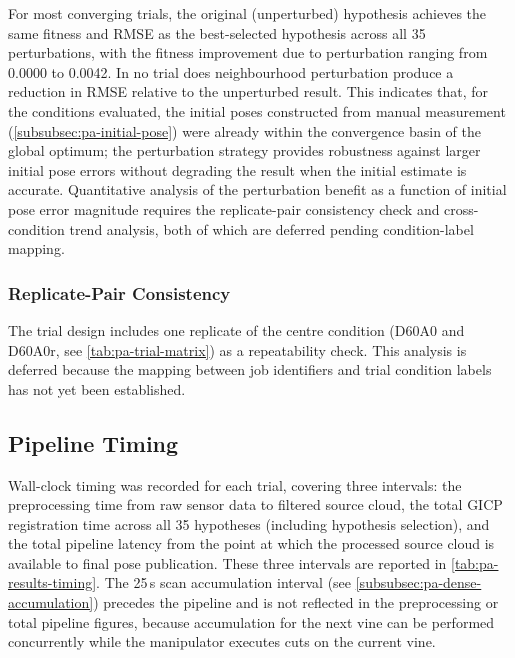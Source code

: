 For most converging trials, the original (unperturbed) hypothesis achieves the same fitness and RMSE as the best-selected hypothesis across all 35 perturbations, with the fitness improvement due to perturbation ranging from 0.0000 to 0.0042. In no trial does neighbourhood perturbation produce a reduction in RMSE relative to the unperturbed result. This indicates that, for the conditions evaluated, the initial poses constructed from manual measurement (\cref{subsubsec:pa-initial-pose}) were already within the convergence basin of the global optimum; the perturbation strategy provides robustness against larger initial pose errors without degrading the result when the initial estimate is accurate. Quantitative analysis of the perturbation benefit as a function of initial pose error magnitude requires the replicate-pair consistency check and cross-condition trend analysis, both of which are deferred pending condition-label mapping.

\subsubsection*{Replicate-Pair Consistency}

The trial design includes one replicate of the centre condition (D60A0 and D60A0r, see \cref{tab:pa-trial-matrix}) as a repeatability check. This analysis is deferred because the mapping between job identifiers and trial condition labels has not yet been established.

\subsection{Pipeline Timing}
\label{subsec:pa-results-timing}

Wall-clock timing was recorded for each trial, covering three intervals: the preprocessing time from raw sensor data to filtered source cloud, the total GICP registration time across all 35 hypotheses (including hypothesis selection), and the total pipeline latency from the point at which the processed source cloud is available to final pose publication. These three intervals are reported in \cref{tab:pa-results-timing}. The 25\,s scan accumulation interval (see \cref{subsubsec:pa-dense-accumulation}) precedes the pipeline and is not reflected in the preprocessing or total pipeline figures, because accumulation for the next vine can be performed concurrently while the manipulator executes cuts on the current vine.

